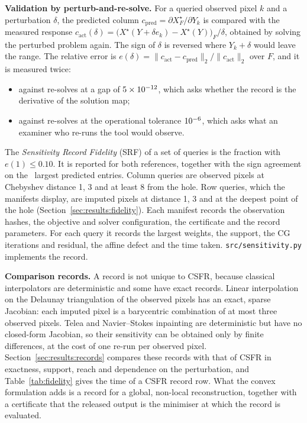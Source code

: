 \documentclass[final,3p]{elsarticle}
\begin{document}
\textbf{Validation by perturb-and-re-solve.} For a queried observed pixel $k$ and a perturbation $\delta$, the predicted column $c_{\mathrm{pred}} = \partial X^{\star}_{F} / \partial Y_{k}$ is compared with the measured response $c_{\mathrm{act}}(\delta) = \bigl(X^{\star}(Y + \delta e_{k}) - X^{\star}(Y)\bigr)_{F} / \delta$, obtained by solving the perturbed problem again. The sign of $\delta$ is reversed where $Y_{k} + \delta$ would leave the range. The relative error is $e(\delta) = \|c_{\mathrm{act}} - c_{\mathrm{pred}}\|_{2} / \|c_{\mathrm{act}}\|_{2}$ over $F$, and it is measured twice:
\begin{itemize}
  \item against re-solves at a gap of $5\times 10^{-12}$, which asks whether the record is the derivative of the solution map;
  \item against re-solves at the operational tolerance $10^{-6}$, which asks what an examiner who re-runs the tool would observe.
\end{itemize}
The \emph{Sensitivity Record Fidelity} (SRF) of a set of queries is the fraction with $e(1) \le 0.10$. It is reported for both references, together with the sign agreement on the \recTopK\ largest predicted entries. Column queries are observed pixels at Chebyshev distance 1, 3 and at least 8 from the hole. Row queries, which the manifests display, are imputed pixels at distance 1, 3 and at the deepest point of the hole (Section~\ref{sec:results:fidelity}). Each manifest records the observation hashes, the objective and solver configuration, the certificate and the record parameters. For each query it records the largest weights, the support, the CG iterations and residual, the affine defect and the time taken. \texttt{src/\allowbreak sensitivity.py} implements the record.

\textbf{Comparison records.} A record is not unique to CSFR, because classical interpolators are deterministic and some have exact records. Linear interpolation on the Delaunay triangulation of the observed pixels has an exact, sparse Jacobian: each imputed pixel is a barycentric combination of at most three observed pixels. Telea and Navier--Stokes inpainting are deterministic but have no closed-form Jacobian, so their sensitivity can be obtained only by finite differences, at the cost of one re-run per observed pixel. Section~\ref{sec:results:records} compares these records with that of CSFR in exactness, support, reach and dependence on the perturbation, and Table~\ref{tab:fidelity} gives the time of a CSFR record row. What the convex formulation adds is a record for a global, non-local reconstruction, together with a certificate that the released output is the minimiser at which the record is evaluated.
\end{document}
